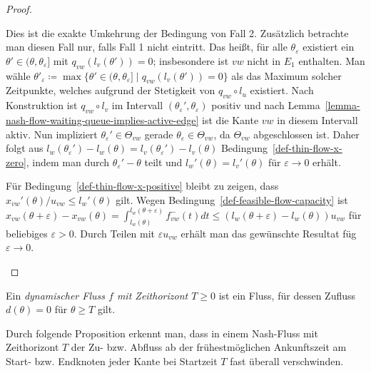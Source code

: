 \begin{proof}
\begin{description}[leftmargin=0cm, topsep=0cm, itemindent=0.5cm]
		Dies ist die exakte Umkehrung der Bedingung von Fall 2.
		Zusätzlich betrachte man diesen Fall nur, falls Fall 1 nicht eintritt.
		Das heißt, für alle $\theta_\varepsilon$ existiert ein $\theta'\in(\theta, \theta_\varepsilon]$ mit $q_{vw}(l_v(\theta')) = 0$; insbesondere ist $vw$ nicht in $E_1$ enthalten.
		Man wähle $\theta'_\varepsilon\coloneq \max\{ \theta'\in (\theta, \theta_\varepsilon] \mid q_{vw}(l_v(\theta')) = 0 \}$ als das Maximum solcher Zeitpunkte, welches aufgrund der Stetigkeit von $q_{vw}\circ l_u$ existiert.
		Nach Konstruktion ist $q_{vw}\circ l_v$ im Intervall $(\theta_\varepsilon', \theta_\varepsilon)$ positiv und nach Lemma~\ref{lemma-nash-flow-waiting-queue-implies-active-edge} ist die Kante $vw$ in diesem Intervall aktiv.
		Nun impliziert $\theta_\varepsilon'\in \Theta_{vw}$ gerade $\theta_\varepsilon\in\Theta_{vw}$, da $\Theta_{vw}$ ab\-ge\-schlossen ist.
		Daher folgt aus $l_w(\theta_\varepsilon') - l_w(\theta) = l_v(\theta_\varepsilon') - l_v(\theta)$ 		Bedingung~\ref{def-thin-flow-x-zero}, indem man durch $\theta_\varepsilon'-\theta$ teilt und $l_w'(\theta) = l_v'(\theta)$ für $\varepsilon\rightarrow0$ erhält.
		
		Für Bedingung~\ref{def-thin-flow-x-positive} bleibt zu zeigen, dass $x_{vw}'(\theta) /u_{vw}\leq l_w'(\theta)$ gilt.
		Wegen Bedingung~\ref{def-feasible-flow-capacity} ist $x_{vw}(\theta + \varepsilon)-x_{vw}(\theta) = \int_{l_w(\theta)}^{l_w(\theta+\varepsilon)} f_{vw}^-(t) dt\leq (l_w(\theta + \varepsilon) - l_w(\theta)) u_{vw}$ für beliebiges $\varepsilon>0$.
		Durch Teilen mit $\varepsilon u_{vw}$ erhält man das gewünschte Resultat füg $\varepsilon\rightarrow 0$.
	\end{description}\vspace{-1.4em}
\end{proof}

\begin{definition}
	Ein \emph{dynamischer Fluss $f$ mit Zeithorizont $T\geq0$} ist ein Fluss, für dessen Zufluss $d(\theta)= 0$ für $\theta\geq T$ gilt.
\end{definition}

Durch folgende Proposition erkennt man, dass in einem Nash-Fluss mit Zeithorizont $T$ der Zu- bzw. Abfluss ab der frühestmöglichen Ankunftszeit am Start- bzw. Endknoten jeder Kante bei Startzeit $T$ fast überall verschwinden.

